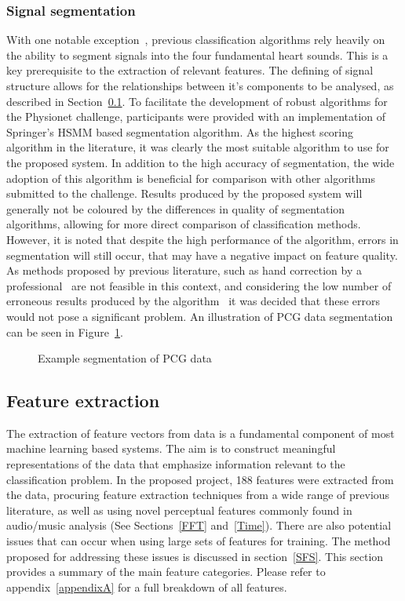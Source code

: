 \documentclass[titlepage, 12pt]{scrartcl} \usepackage{enumitem}
\begin{document}
\subsubsection{Signal segmentation}
With one notable exception~\parencite{Langley2016}, previous classification
algorithms rely heavily on the ability to segment signals into the four
fundamental heart sounds. This is a key prerequisite to the extraction of
relevant features. The defining of signal structure allows for the
relationships between it's components to be analysed, as described in
Section~\ref{featEx}. To facilitate the development of robust algorithms for
the Physionet challenge, participants were provided with an implementation of
Springer's HSMM based segmentation algorithm. As the highest scoring algorithm
in the literature, it was clearly the most suitable algorithm to use for the
proposed system. In addition to the high accuracy of segmentation, the wide
adoption of this algorithm is beneficial for comparison with other algorithms
submitted to the challenge. Results produced by the proposed system will
generally not be coloured by the differences in quality of segmentation
algorithms, allowing for more direct comparison of classification methods.
However, it is noted that despite the high performance of the algorithm, errors
in segmentation will still occur, that may have a negative impact on feature
quality. As methods proposed by previous literature, such as hand correction by
a professional~\parencite[p.2203]{Liu2016} are not feasible in this context,
and considering the low number of erroneous results produced by the
algorithm~\parencite[p.2]{Goda2016} it was decided that these errors would not
pose a significant problem. An illustration of PCG data segmentation can be
seen in Figure~\ref{segs}.

\begin{figure}[H]
    \caption{Example segmentation of PCG data}
    \label{segs}
\end{figure}



\subsection{Feature extraction}\label{featEx}
The extraction of feature vectors from data is a fundamental component of most
machine learning based systems. The aim is to construct meaningful
representations of the data that emphasize information relevant to the
classification problem. In the proposed project, 188 features were extracted
from the data, procuring feature extraction techniques from a wide range of
previous literature, as well as using novel perceptual features commonly found
in audio/music analysis (See Sections~\ref{FFT} and~\ref{Time}).
There are also potential issues that can occur when using large sets of
features for training. The method proposed for addressing these issues is
discussed in section~\ref{SFS}. This section provides a summary of the main
feature categories. Please refer to appendix~\ref{appendixA} for a full
breakdown of all features.
\end{document}
